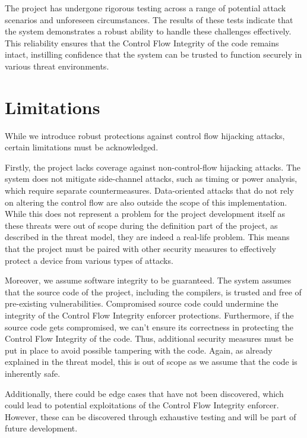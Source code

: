 The project has undergone rigorous testing across a range of potential attack
scenarios and unforeseen circumstances. The results of these tests indicate that
the system demonstrates a robust ability to handle these challenges effectively.
This reliability ensures that the Control Flow Integrity of the code remains
intact, instilling confidence that the system can be trusted to function securely
in various threat environments.

\section{Limitations}
\label{sec:ta_limitations}

While we introduce robust protections against control flow hijacking attacks, certain
limitations must be acknowledged.

Firstly, the project lacks coverage against non-control-flow hijacking attacks. The
system does not mitigate side-channel attacks, such as timing or power analysis,
which require separate countermeasures. Data-oriented attacks that do not rely
on altering the control flow are also outside the scope of this implementation. While
this does not represent a problem for the project development itself as these threats
were out of scope during the definition part of the project, as described in the
threat model, they are indeed a real-life problem. This means that the project
must be paired with other security measures to effectively protect a device from
various types of attacks.

Moreover, we assume software integrity to be guaranteed. The system assumes that
the source code of the project, including the compilers, is trusted and free of
pre-existing vulnerabilities. Compromised source code could undermine the integrity
of the Control Flow Integrity enforcer protections. Furthermore, if the source code
gets compromised, we can't ensure its correctness in protecting the Control Flow
Integrity of the code. Thus, additional security measures must be put in place
to avoid possible tampering with the code. Again, as already explained in the
threat model, this is out of scope as we assume that the code is inherently safe.

Additionally, there could be edge cases that have not been discovered, which could
lead to potential exploitations of the Control Flow Integrity enforcer. However,
these can be discovered through exhaustive testing and will be part of future development.

